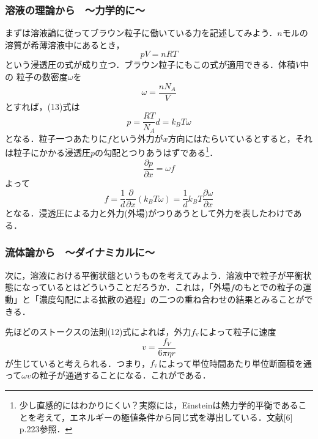 \documentclass{jsarticle}
\begin{document}
\subsubsection{溶液の理論から　〜力学的に〜}
まずは溶液論に従ってブラウン粒子に働いている力を記述してみよう．$n$モルの溶質が希薄溶液中にあるとき，
\begin{equation}
pV=nRT
\end{equation}
という浸透圧の式が成り立つ．ブラウン粒子にもこの式が適用できる．体積$V$中の
粒子の数密度$\omega$を
\begin{equation}
\omega =\frac{nN_A}{V}
\end{equation}
とすれば，(13)式は
\begin{equation}
p=\frac{RT}{N_A} d=k_B T \omega
\end{equation}
となる．粒子一つあたりに$f$という外力が$x$方向にはたらいているとすると，それは粒子にかかる浸透圧$p$の勾配とつりあうはずである\footnote{少し直感的にはわかりにくい？実際には，Einsteinは熱力学的平衡であることを考えて，エネルギーの極値条件から同じ式を導出している．文献[6] p.223参照．}．
\begin{equation}
\frac{\partial p}{\partial x}=\omega f
\end{equation}
よって
\begin{equation}
f=\frac{1}{d} \frac{\partial}{\partial x} (k_B T \omega)=\frac{1}{d} k_B T \frac{\partial \omega}{\partial x}
\end{equation}
となる．浸透圧による力と外力(外場)がつりあうとして外力を表したわけである．
\subsubsection{流体論から　〜ダイナミカルに〜}
次に，溶液における平衡状態というものを考えてみよう．溶液中で粒子が平衡状態になっているとはどういうことだろうか．これは，「外場$f$のもとでの粒子の運動」と「濃度勾配による拡散の過程」の二つの重ね合わせの結果とみることができる．

先ほどのストークスの法則(12)式によれば，外力$f_{\scalebox{0.5}{V}}$によって粒子に速度
\begin{equation}
v=\frac{f_V}{6 \pi \eta r}
\end{equation}
が生じていると考えられる．つまり，$f_{\scalebox{0.5}{V}}$によって単位時間あたり単位断面積を通って$\omega v$の粒子が通過することになる．これがである．
\end{document}

